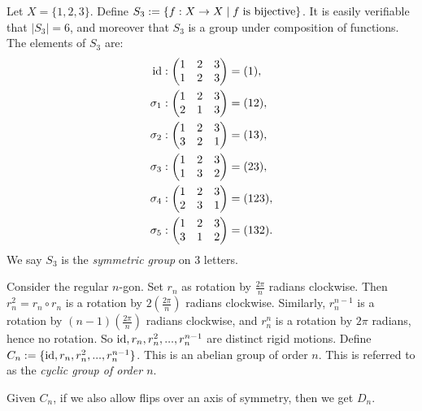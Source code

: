     \begin{example}
        Let $X = \{1,2,3\}$. Define $S_3 := \{f:X \rightarrow X \mid f \h3\text{is bijective}\}$. It is easily verifiable that $|S_3| = 6$, and moreover that $S_3$ is a group under composition of functions. The elements of $S_3$ are:
            \begin{equation*}
            \begin{split}
                \id&: \bmat 1 & 2 & 3 \\ 1 & 2 & 3 \emat = (1), \\
                \sigma_1&: \bmat 1 & 2 & 3 \\ 2 & 1 & 3 \emat = (12), \\
                \sigma_2&: \bmat 1 & 2 & 3 \\ 3 & 2 & 1 \emat = (13), \\
                \sigma_3&: \bmat 1 & 2 & 3 \\ 1 & 3 & 2 \emat = (23), \\
                \sigma_4&: \bmat 1 & 2 & 3 \\ 2 & 3 & 1 \emat = (123), \\
                \sigma_5&: \bmat 1 & 2 & 3 \\ 3 & 1 & 2 \emat = (132). \\
            \end{split}
            \end{equation*}
        We say $S_3$ is the \textit{symmetric group} on 3 letters.
    \end{example}

    \begin{example}
        Consider the regular $n$-gon. Set $r_n$ as rotation by $\frac{2\pi}{n}$ radians  clockwise. Then $r_n^2 = r_n \circ r_n$ is a rotation by $2 \left( \frac{2\pi}{n} \right)$ radians clockwise. Similarly, $r_n^{n-1}$ is a rotation by $(n-1) \left( \frac{2\pi}{n} \right)$ radians clockwise, and $r_n^n$ is a rotation by $2\pi$ radians, hence no rotation. So $\id,r_n,r_n^2,...,r_n^{n-1}$ are distinct rigid motions. Define $C_n := \{\id,r_n,r_n^2,...,r_n^{n-1}\}$. This is an abelian group of order $n$. This is referred to as the \textit{cyclic group of order $n$}.

        Given $C_n$, if we also allow flips over an axis of symmetry, then we get $D_n$.
    \end{example}

